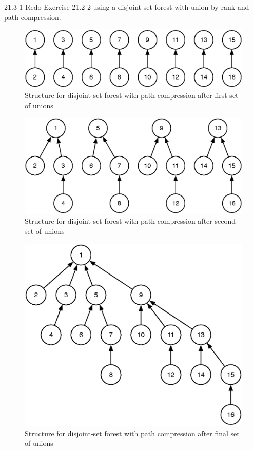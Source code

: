 

\usepackage{graphicx}




\homeworkheader{\classnameandsection}

\begin{problem}{21.3-1}
  Redo Exercise 21.2-2 using a disjoint-set forest with union by rank and path compression.
  \begin{solution}
    \begin{figure}[H]
      \centering
      \caption{Structure for disjoint-set forest with path compression after first set of unions}
      \includegraphics[scale=.5]{21_3_1_1.eps}
    \end{figure}
    \begin{figure}[H]
      \centering
      \caption{Structure for disjoint-set forest with path compression after second set of unions}
      \includegraphics[scale=.5]{21_3_1_2.eps}
    \end{figure}
    \begin{figure}[H]
      \centering
      \caption{Structure for disjoint-set forest with path compression after final set of unions}
      \includegraphics[scale=.5]{21_3_1_3.eps}

\end{figure}
\end{solution}
\end{problem}
